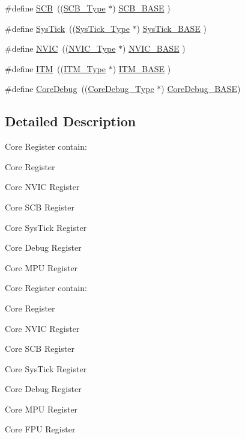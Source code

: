 \begin{DoxyCompactItemize}
\#define \hyperlink{group___c_m_s_i_s__core__register_gaaaf6477c2bde2f00f99e3c2fd1060b01}{S\-C\-B}~((\hyperlink{struct_s_c_b___type}{S\-C\-B\-\_\-\-Type}       $\ast$)     \hyperlink{group___c_m_s_i_s__core__register_gad55a7ddb8d4b2398b0c1cfec76c0d9fd}{S\-C\-B\-\_\-\-B\-A\-S\-E}      )
\item 
\#define \hyperlink{group___c_m_s_i_s__core__register_gacd96c53beeaff8f603fcda425eb295de}{Sys\-Tick}~((\hyperlink{struct_sys_tick___type}{Sys\-Tick\-\_\-\-Type}   $\ast$)     \hyperlink{group___c_m_s_i_s__core__register_ga58effaac0b93006b756d33209e814646}{Sys\-Tick\-\_\-\-B\-A\-S\-E}  )
\item 
\#define \hyperlink{group___c_m_s_i_s__core__register_gac8e97e8ce56ae9f57da1363a937f8a17}{N\-V\-I\-C}~((\hyperlink{struct_n_v_i_c___type}{N\-V\-I\-C\-\_\-\-Type}      $\ast$)     \hyperlink{group___c_m_s_i_s__core__register_gaa0288691785a5f868238e0468b39523d}{N\-V\-I\-C\-\_\-\-B\-A\-S\-E}     )
\item 
\#define \hyperlink{group___c_m_s_i_s__core__register_gabae7cdf882def602cb787bb039ff6a43}{I\-T\-M}~((\hyperlink{struct_i_t_m___type}{I\-T\-M\-\_\-\-Type}       $\ast$)     \hyperlink{group___c_m_s_i_s__core__register_gadd76251e412a195ec0a8f47227a8359e}{I\-T\-M\-\_\-\-B\-A\-S\-E}      )
\item 
\#define \hyperlink{group___c_m_s_i_s__core__register_gab6e30a2b802d9021619dbb0be7f5d63d}{Core\-Debug}~((\hyperlink{struct_core_debug___type}{Core\-Debug\-\_\-\-Type} $\ast$)     \hyperlink{group___c_m_s_i_s__core__register_ga680604dbcda9e9b31a1639fcffe5230b}{Core\-Debug\-\_\-\-B\-A\-S\-E})
\end{DoxyCompactItemize}


\subsection{Detailed Description}
Core Register contain\-:
\begin{DoxyItemize}
\item Core Register
\item Core N\-V\-I\-C Register
\item Core S\-C\-B Register
\item Core Sys\-Tick Register
\item Core Debug Register
\item Core M\-P\-U Register
\end{DoxyItemize}

Core Register contain\-:
\begin{DoxyItemize}
\item Core Register
\item Core N\-V\-I\-C Register
\item Core S\-C\-B Register
\item Core Sys\-Tick Register
\item Core Debug Register
\item Core M\-P\-U Register
\item Core F\-P\-U Register 
\end{DoxyItemize}


